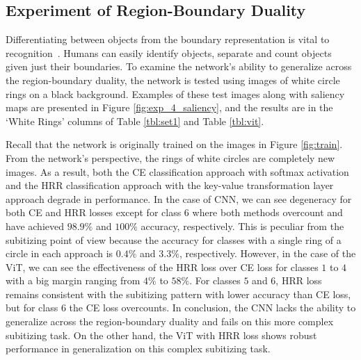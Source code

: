 \documentclass[letterpaper]{article} %
\begin{document}
\subsection{Experiment of Region-Boundary Duality}
Differentiating between objects from the boundary representation is vital to recognition~\cite{b7}. Humans can easily identify objects, separate and count objects given just their boundaries. To examine the network’s ability to generalize across the region-boundary duality, the network is tested using images of white circle rings on a black background. Examples of these test images along with saliency maps are presented in Figure \ref{fig:exp_4_saliency}, and the results are in the `White Rings’ columns of Table \ref{tbl:set1} and Table \ref{tbl:vit}.
\par 
Recall that the network is originally trained on the images in Figure \ref{fig:train}.  From the network’s perspective, the rings of white circles are completely new images. As a result, both the CE classification approach with softmax activation and the HRR classification approach with the key-value transformation layer approach degrade in performance. In the case of CNN, we can see degeneracy for both CE and HRR losses except for class $6$ where both methods overcount and have achieved $98.9\%$ and $100\%$ accuracy, respectively. This is peculiar from the subitizing point of view because the accuracy for classes with a single ring of a circle in each approach is $0.4\%$ and $3.3\%$, respectively. However, in the case of the ViT, we can see the effectiveness of the HRR loss over CE loss for classes $1$ to $4$ with a big margin ranging from $4\%$ to $58\%$. For classes $5$ and $6$, HRR loss remains consistent with the subitizing pattern with lower accuracy than CE loss, but for class $6$ the CE loss overcounts. In conclusion, the CNN lacks the ability to generalize across the region-boundary duality and fails on this more complex subitizing task.  On the other hand, the ViT with HRR loss shows robust performance in generalization on this complex subitizing task.
\end{document}
